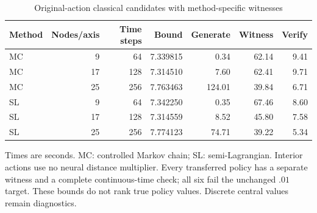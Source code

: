 \begin{table}[t]
\centering\small
\caption{Original-action classical candidates with method-specific witnesses}\label{tab:r18classical}
\begin{tabular}{lrrrrrr}
\toprule
Method & Nodes/axis & Time steps & Bound & Generate & Witness & Verify\\
\midrule
MC & 9 & 64 & 7.339815 & 0.34 & 62.14 & 9.41\\
MC & 17 & 128 & 7.314510 & 7.60 & 62.41 & 9.71\\
MC & 25 & 256 & 7.763463 & 124.01 & 39.84 & 6.71\\
SL & 9 & 64 & 7.342250 & 0.35 & 67.46 & 8.60\\
SL & 17 & 128 & 7.314559 & 8.52 & 45.80 & 7.58\\
SL & 25 & 256 & 7.774123 & 74.71 & 39.22 & 5.34\\
\bottomrule
\end{tabular}
\par\smallskip\begin{minipage}{.98\linewidth}\footnotesize Times are seconds. MC: controlled Markov chain; SL: semi-Lagrangian. Interior actions use no neural distance multiplier. Every transferred policy has a separate witness and a complete continuous-time check; all six fail the unchanged $.01$ target. These bounds do not rank true policy values. Discrete central values remain diagnostics.\end{minipage}
\end{table}
